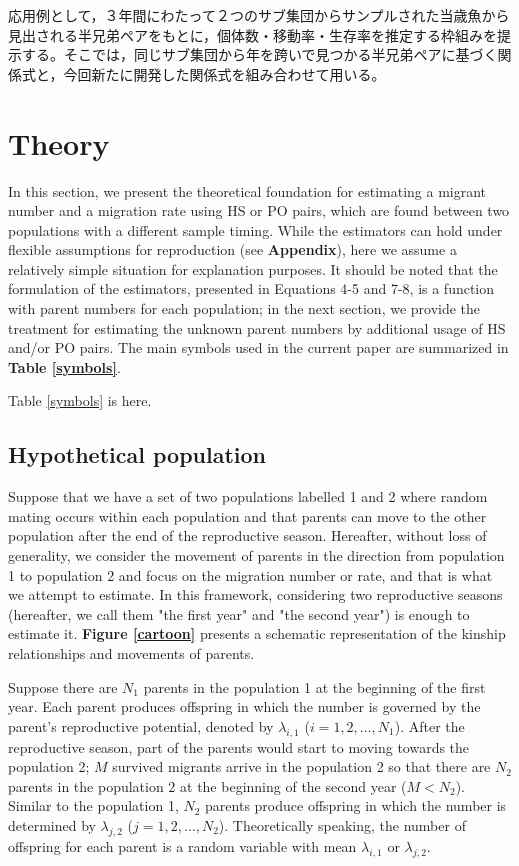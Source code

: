 \documentclass[12pt, English]{article}
\begin{document}
\begin{spacing}{1.9}
応用例として，３年間にわたって２つのサブ集団からサンプルされた当歳魚から見出される半兄弟ペアをもとに，個体数・移動率・生存率を推定する枠組みを提示する。そこでは，同じサブ集団から年を跨いで見つかる半兄弟ペアに基づく関係式と，今回新たに開発した関係式を組み合わせて用いる。

\section{Theory}\label{sec2}
In this section, we present the theoretical foundation for estimating a migrant number and a migration rate using HS or PO pairs, which are found between two populations with a different sample timing. While the estimators can hold under flexible assumptions for reproduction (see {\bf Appendix}), here we assume a relatively simple situation for explanation purposes. It should be noted that the formulation of the estimators, presented in Equations 4-5 and 7-8, is a function with parent numbers for each population; in the next section, we provide the treatment for estimating the unknown parent numbers by additional usage of HS and/or PO pairs. The main symbols used in the current paper are summarized in {\bf Table \ref{symbols}}. 

\begin{center}
Table \ref{symbols} is here. 
\end{center}

\subsection{Hypothetical population}

Suppose that we have a set of two populations labelled 1 and 2 where random mating occurs within each population and that parents can move to the other population after the end of the reproductive season. Hereafter, without loss of generality, we consider the movement of parents in the direction from population 1 to population 2 and focus on the migration number or rate, and that is what we attempt to estimate. In this framework, considering two reproductive seasons (hereafter, we call them "the first year" and "the second year") is enough to estimate it. {\bf Figure \ref{cartoon}} presents a schematic representation of the kinship relationships and movements of parents. 

Suppose there are $N_1$ parents in the population 1 at the beginning of the first year. Each parent produces offspring in which the number is governed by the parent's reproductive potential, denoted by $\lambda_{i,1}$ ($i=1,2,\ldots,N_1$). After the reproductive season, part of the parents would start to moving towards the population 2; $M$ survived migrants arrive in the population 2 so that there are $N_2$ parents in the population 2 at the beginning of the second year ($M < N_2$). Similar to the population 1, $N_2$ parents produce offspring in which the number is determined by $\lambda_{j,2}$ ($j=1,2,\ldots,N_2$). Theoretically speaking, the number of offspring for each parent is a random variable with mean $\lambda_{i,1}$ or $\lambda_{j,2}$. 


\end{spacing}
\end{document}
